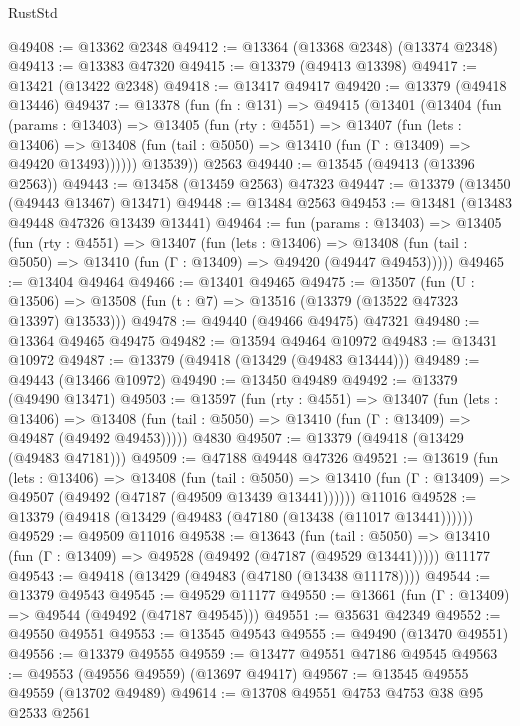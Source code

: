 \begin{lexlean}{RustStd}
\begin{coremodule}
@49408 := @13362 @2348
@49412 := @13364 (@13368 @2348) (@13374 @2348)
@49413 := @13383 @47320
@49415 := @13379 (@49413 @13398)
@49417 := @13421 (@13422 @2348)
@49418 := @13417 @49417
@49420 := @13379 (@49418 @13446)
@49437 := @13378
    (fun (fn : @131) =>
    @49415
      (@13401
        (@13404
          (fun (params : @13403) =>
          @13405
            (fun (rty : @4551) =>
            @13407
              (fun (lets : @13406) =>
              @13408 (fun (tail : @5050) => @13410 (fun (Γ : @13409) => @49420 @13493))))))
        @13539))
    @2563
@49440 := @13545 (@49413 (@13396 @2563))
@49443 := @13458 (@13459 @2563) @47323
@49447 := @13379 (@13450 (@49443 @13467) @13471)
@49448 := @13484 @2563
@49453 := @13481 (@13483 @49448 @47326 @13439 @13441)
@49464 := fun (params : @13403) =>
  @13405
    (fun (rty : @4551) =>
    @13407
      (fun (lets : @13406) =>
      @13408 (fun (tail : @5050) => @13410 (fun (Γ : @13409) => @49420 (@49447 @49453)))))
@49465 := @13404 @49464
@49466 := @13401 @49465
@49475 := @13507
    (fun (U : @13506) => @13508 (fun (t : @7) => @13516 (@13379 (@13522 @47323 @13397) @13533)))
@49478 := @49440 (@49466 @49475) @47321
@49480 := @13364 @49465 @49475
@49482 := @13594 @49464 @10972
@49483 := @13431 @10972
@49487 := @13379 (@49418 (@13429 (@49483 @13444)))
@49489 := @49443 (@13466 @10972)
@49490 := @13450 @49489
@49492 := @13379 (@49490 @13471)
@49503 := @13597
    (fun (rty : @4551) =>
    @13407
      (fun (lets : @13406) =>
      @13408 (fun (tail : @5050) => @13410 (fun (Γ : @13409) => @49487 (@49492 @49453)))))
    @4830
@49507 := @13379 (@49418 (@13429 (@49483 @47181)))
@49509 := @47188 @49448 @47326
@49521 := @13619
    (fun (lets : @13406) =>
    @13408
      (fun (tail : @5050) =>
      @13410 (fun (Γ : @13409) => @49507 (@49492 (@47187 (@49509 @13439 @13441))))))
    @11016
@49528 := @13379 (@49418 (@13429 (@49483 (@47180 (@13438 (@11017 @13441))))))
@49529 := @49509 @11016
@49538 := @13643
    (fun (tail : @5050) => @13410 (fun (Γ : @13409) => @49528 (@49492 (@47187 (@49529 @13441)))))
    @11177
@49543 := @49418 (@13429 (@49483 (@47180 (@13438 @11178))))
@49544 := @13379 @49543
@49545 := @49529 @11177
@49550 := @13661 (fun (Γ : @13409) => @49544 (@49492 (@47187 @49545)))
@49551 := @35631 @42349
@49552 := @49550 @49551
@49553 := @13545 @49543
@49555 := @49490 (@13470 @49551)
@49556 := @13379 @49555
@49559 := @13477 @49551 @47186 @49545
@49563 := @49553 (@49556 @49559) (@13697 @49417)
@49567 := @13545 @49555 @49559 (@13702 @49489)
@49614 := @13708
    @49551
    @4753
    @4753
    @38
    @95
    @2533
    @2561

\end{coremodule}
\end{lexlean}
